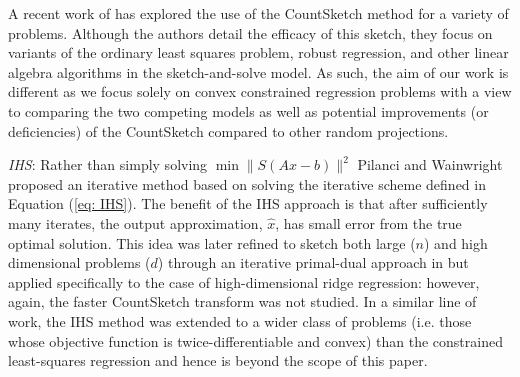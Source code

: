 A recent work of \cite{dahiya2018empirical} has explored the use of the
CountSketch method for a variety of problems.
Although the authors detail the efficacy of this sketch, they focus on
variants of the ordinary least squares problem, robust regression, and other
linear algebra algorithms in the sketch-and-solve model.
As such, the aim of our work is different as we focus solely on convex
constrained regression problems with a view to comparing the two competing
models as well as potential improvements (or deficiencies) of the CountSketch
compared to other random projections.



\noindent\textit{IHS}:
Rather than simply solving $\min \|S(Ax-b)\|^2$ Pilanci and Wainwright
\cite{pilanci2016iterative}
proposed an iterative method based on solving the iterative
scheme defined in Equation (\ref{eq: IHS}).
The benefit of the IHS approach is that after sufficiently many iterates,
the output approximation, $\hat{x}$, has small error from the true
optimal solution.
This idea was later refined to sketch both large ($n$) and high dimensional
problems ($d$) through an iterative primal-dual approach in
 \cite{wang2017sketching} but applied specifically to the case of
  high-dimensional ridge regression:
 however, again, the faster CountSketch transform
was not studied.
In a similar line of work, the IHS method was extended to a wider class
of problems (i.e. those whose objective function is twice-differentiable and
convex) than the constrained least-squares regression
\cite{pilanci2017newton} and hence is beyond the scope of this paper.


